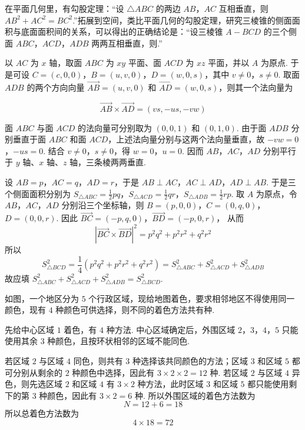 \begin{problem}
在平面几何里，有勾股定理：“设 \(\triangle ABC\) 的两边 \(AB\)，\(AC\) 互相垂直，则 \(AB^2+AC^2=BC^2\).”拓展到空间，类比平面几何的勾股定理，研究三棱锥的侧面面积与底面面积间的关系，可以得出的正确结论是：“设三棱锥 \(A-BCD\) 的三个侧面 \(ABC\)，\(ACD\)，\(ADB\) 两两互相垂直，则\fillinblank{}.”

\begin{solution}
以 \(AC\) 为 \(x\) 轴，取面 \(ABC\) 为 \(xy\) 平面、面 \(ACD\) 为 \(xz\) 平面，并以 \(A\) 为原点. 于是可设
\(C=(c,0,0)\)，\(B=(u,v,0)\)，\(D=(w,0,s)\)，其中 \(v\ne0\)，\(s\ne0\). 取面 \(ADB\) 的两个方向向量
\(\overrightarrow{AB}=(u,v,0)\) 和 \(\overrightarrow{AD}=(w,0,s)\)，则其一个法向量为

\[
\overrightarrow{AB}\times\overrightarrow{AD}=(vs,-us,-vw)
\]

面 \(ABC\) 与面 \(ACD\) 的法向量可分别取为 \((0,0,1)\) 和 \((0,1,0)\). 由于面 \(ADB\) 分别垂直于面 \(ABC\) 和面 \(ACD\)，上述法向量分别与这两个法向量垂直，故
\(-vw=0\)，\(-us=0\). 结合 \(v\ne0\)，\(s\ne0\)，得 \(w=0\)，\(u=0\). 因而 \(AB\)，\(AC\)，\(AD\) 分别平行于 \(y\) 轴、\(x\) 轴、\(z\) 轴，三条棱两两垂直.

设 \(AB=p\)，\(AC=q\)，\(AD=r\)，于是
\(AB\perp AC\)，\(AC\perp AD\)，\(AD\perp AB\).
于是三个侧面面积分别为 \(S_{\triangle ABC}=\frac12pq\)，\(S_{\triangle ACD}=\frac12qr\)，\(S_{\triangle ADB}=\frac12rp\).
取 \(A\) 为原点，令 \(AB\)，\(AC\)，\(AD\) 分别沿三个坐标轴，则
\(B=(p,0,0)\)，\(C=(0,q,0)\)，\(D=(0,0,r)\). 因此 \(\overrightarrow{BC}=(-p,q,0)\)，\(\overrightarrow{BD}=(-p,0,r)\)，
从而
\[
\left|\overrightarrow{BC}\times\overrightarrow{BD}\right|^2
=p^2q^2+p^2r^2+q^2r^2
\]
所以
\[
S_{\triangle BCD}^{2}
=\frac14\left(p^2q^2+p^2r^2+q^2r^2\right)
=S_{\triangle ABC}^{2}+S_{\triangle ACD}^{2}+S_{\triangle ADB}^{2}
\]
故应填 \(S_{\triangle ABC}^{2}+S_{\triangle ACD}^{2}+S_{\triangle ADB}^{2}=S_{\triangle BCD}^{2}\).
\end{solution}
\end{problem}

\begin{problem}
如图，一个地区分为 \(5\) 个行政区域，现给地图着色，要求相邻地区不得使用同一颜色，现有 \(4\) 种颜色可供选择，则不同的着色方法共有\fillinblank{}种.


\begin{solution}
先给中心区域 \(1\) 着色，有 \(4\) 种方法. 中心区域确定后，外围区域 \(2\)，\(3\)，\(4\)，\(5\) 只能使用其余 \(3\) 种颜色，且按环状相邻的区域不能同色.

若区域 \(2\) 与区域 \(4\) 同色，则共有 \(3\) 种选择该共同颜色的方法；区域 \(3\) 和区域 \(5\) 都可分别从剩余的 \(2\) 种颜色中选择，因此有 \(3\times2\times2=12\) 种. 若区域 \(2\) 与区域 \(4\) 异色，则先选区域 \(2\) 和区域 \(4\) 有 \(3\times2\) 种方法，此时区域 \(3\) 和区域 \(5\) 都只能使用剩下的第 \(3\) 种颜色，因此有 \(3\times2=6\) 种. 所以外围区域的着色方法数为
\[
N=12+6=18
\]
所以总着色方法数为
\[
4\times18=72
\]
\end{solution}
\end{problem}

